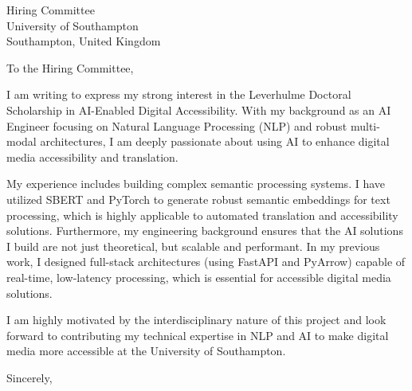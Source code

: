 \documentclass[11pt,a4paper]{letter}
\begin{document}
\begin{letter}{
    Hiring Committee \\
    University of Southampton \\
    Southampton, United Kingdom
}
\opening{To the Hiring Committee,}

I am writing to express my strong interest in the Leverhulme Doctoral Scholarship in AI-Enabled Digital Accessibility. With my background as an AI Engineer focusing on Natural Language Processing (NLP) and robust multi-modal architectures, I am deeply passionate about using AI to enhance digital media accessibility and translation.

My experience includes building complex semantic processing systems. I have utilized SBERT and PyTorch to generate robust semantic embeddings for text processing, which is highly applicable to automated translation and accessibility solutions. Furthermore, my engineering background ensures that the AI solutions I build are not just theoretical, but scalable and performant. In my previous work, I designed full-stack architectures (using FastAPI and PyArrow) capable of real-time, low-latency processing, which is essential for accessible digital media solutions.

I am highly motivated by the interdisciplinary nature of this project and look forward to contributing my technical expertise in NLP and AI to make digital media more accessible at the University of Southampton.

\closing{Sincerely,}
\end{letter}
\end{document}
